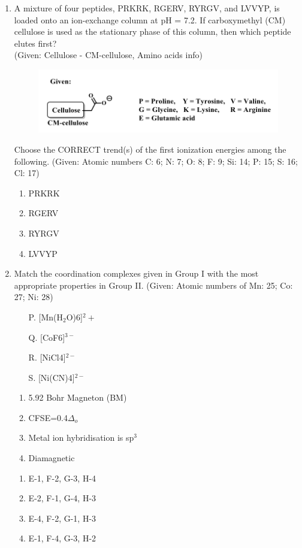\documentclass[journal,12pt,onecolumn]{IEEEtran}
\begin{document}
\begin{enumerate}
    \item A mixture of four peptides, PRKRK, RGERV, RYRGV, and LVVYP, is loaded onto an ion-exchange column at pH = 7.2. If carboxymethyl (CM) cellulose is used as the stationary phase of this column, then which peptide elutes first?\\
    (Given: Cellulose - CM-cellulose, Amino acids info)
    \begin{figure}[H]
		\centering
            \includegraphics{21}
		    \caption*{}
		\label{fig:Q21}
	\end{figure}

     Choose the CORRECT trend(s) of the first ionization energies among the following. (Given: Atomic numbers C: 6; N: 7; O: 8; F: 9; Si: 14; P: 15; S: 16; Cl: 17)
    \begin{enumerate}
        \item PRKRK
        \item RGERV
        \item RYRGV
        \item LVVYP
    \end{enumerate}

    \item Match the coordination complexes given in Group I with the most appropriate properties in Group II. (Given: Atomic numbers of Mn: 25; Co: 27; Ni: 28)
    

    \begin{minipage}{0.45\textwidth}
	    \begin{enumerate}
        \item[P.] [Mn(H$_2$O)6]$^2+$
        \item[Q.] [CoF6]$^{3-}$
        \item[R.] [NiCl4]$^{2-}$
        \item[S.] [Ni(CN)4]$^{2-}$
    \end{enumerate}
    \end{minipage}
    \begin{minipage}{0.45\textwidth}
    \begin{enumerate}
        \item 5.92 Bohr Magneton (BM)
        \item CFSE=0.4$\Delta_o$
        \item Metal ion hybridisation is sp$^3$
        \item Diamagnetic
    \end{enumerate}
    \end{minipage}
    \begin{enumerate}
        \item E-1, F-2, G-3, H-4
        \item E-2, F-1, G-4, H-3
        \item E-4, F-2, G-1, H-3
        \item E-1, F-4, G-3, H-2
    \end{enumerate}


\end{enumerate}
\end{document}
